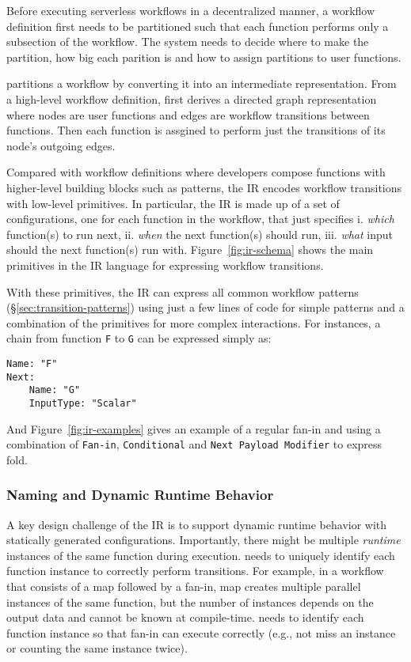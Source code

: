 Before executing serverless workflows in a decentralized manner, a workflow
definition first needs to be partitioned such that each function performs only
a subsection of the workflow. The system needs to decide where to make the
partition, how big each parition is and how to assign partitions to user
functions.

\name{} partitions a workflow by converting it into an intermediate
representation. From a high-level workflow definition, \name{} first derives a
directed graph representation where nodes are user functions and edges are
workflow transitions between functions. Then each function is assgined to
perform just the transitions of its node's outgoing edges.

Compared with workflow definitions where developers compose functions with
higher-level building blocks such as patterns, the \name{} IR encodes workflow
transitions with low-level primitives. In particular, the IR is made up of a
set of configurations, one for each function in the workflow, that just
specifies i. \textit{which} function(s) to run next, ii. \textit{when} the
next function(s) should run, iii. \textit{what} input should the next
function(s) run with. Figure~\ref{fig:ir-schema} shows the main primitives in
the \name{} IR language for expressing workflow transitions.

With these primitives, the IR can express all common workflow patterns
(\S\ref{sec:transition-patterns}) using just a few lines of code for simple
patterns and a combination of the primitives for more complex interactions.
For instances, a chain from function \texttt{F} to \texttt{G} can be expressed
simply as:
\begin{verbatim}
Name: "F"
Next:
    Name: "G"
    InputType: "Scalar"
\end{verbatim}

And Figure~\ref{fig:ir-examples} gives an example of a regular fan-in and
using a combination of \texttt{Fan-in}, \texttt{Conditional} and \texttt{Next
Payload Modifier} to express fold.


\subsubsection{Naming and Dynamic Runtime Behavior}\label{sec:ir:naming}

A key design challenge of the \name{} IR is to support dynamic runtime
behavior with statically generated configurations. Importantly, there might be
multiple \emph{runtime} instances of the same function during execution.
\name{} needs to uniquely identify each function instance to correctly perform
transitions. For example, in a workflow that consists of a map followed by a
fan-in, map creates multiple parallel instances of the same function, but the
number of instances depends on the output data and cannot be known at
compile-time. \name{} needs to identify each function instance so that fan-in
can execute correctly (e.g., not miss an instance or counting the same
instance twice).

